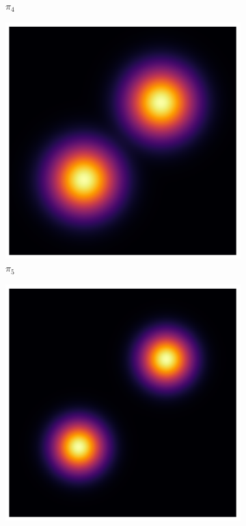 \begin{figure}[t]
\begin{subfigure}{0.15\textwidth}
      \caption*{$\pi_4$}
    \end{subfigure}
    \begin{subfigure}{0.15\textwidth}
      \centering
      \includegraphics[width=\textwidth]{img/heatmap_path_5.pdf}
      \caption*{$\pi_5$}
    \end{subfigure}
    \begin{subfigure}{0.15\textwidth}
      \centering
      \includegraphics[width=\textwidth]{img/heatmap_path_6.pdf}

\end{subfigure}
\end{figure}
